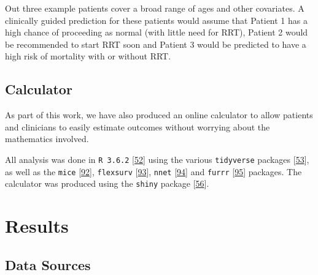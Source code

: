 \documentclass[12pt,PhD,twoside,openright]{muthesis}
\begin{document}
Out three example patients cover a broad range of ages and other covariates. A clinically guided prediction for these patients would assume that Patient 1 has a high chance of proceeding as normal (with little need for RRT), Patient 2 would be recommended to start RRT soon and Patient 3 would be predicted to have a high risk of mortality with or without RRT.

\hypertarget{calculator}{%
\subsection{Calculator}\label{calculator}}

As part of this work, we have also produced an online calculator to allow patients and clinicians to easily estimate outcomes without worrying about the mathematics involved.

All analysis was done in \texttt{R\ 3.6.2} {[}\protect\hyperlink{ref-r_core_team_r_nodate}{52}{]} using the various \texttt{tidyverse} packages {[}\protect\hyperlink{ref-wickham_tidy_2017}{53}{]}, as well as the \texttt{mice} {[}\protect\hyperlink{ref-buuren_mice_2011-1}{92}{]}, \texttt{flexsurv} {[}\protect\hyperlink{ref-jackson_flexsurv_nodate}{93}{]}, \texttt{nnet} {[}\protect\hyperlink{ref-ripley_package_2016}{94}{]} and \texttt{furrr} {[}\protect\hyperlink{ref-vaughan_furrr_2018}{95}{]} packages. The calculator was produced using the \texttt{shiny} package {[}\protect\hyperlink{ref-chang_shiny_2020}{56}{]}.

\hypertarget{results-5}{%
\section{Results}\label{results-5}}

\hypertarget{data-sources-1}{%
\subsection{Data Sources}\label{data-sources-1}}
\end{document}

